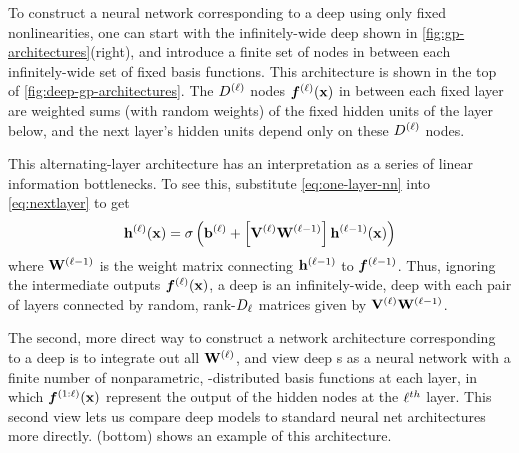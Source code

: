 To construct a neural network corresponding to a deep \gp{} using only fixed nonlinearities, 
one can start with the infinitely-wide deep \gp{} shown in \cref{fig:gp-architectures}(right), and introduce a finite set of nodes in between each infinitely-wide set of fixed basis functions.
This architecture is shown in the top of \cref{fig:deep-gp-architectures}.
The $D^{(\ell)}$ nodes $\boldsymbol{f}^{(\ell)}({\bf{x}})$ in between each fixed layer are weighted sums (with random weights) of the fixed hidden units of the layer below, and the next layer's hidden units depend only on these $D^{(\ell)}$ nodes.

This alternating-layer architecture has an interpretation as a series of linear information bottlenecks.
To see this, substitute \cref{eq:one-layer-nn} into \cref{eq:nextlayer} to get
%
\begin{align}
{\bf{h}}^{(\ell)}({\bf{x}}) = \sigma \left( {\bf{b}}^{(\ell)} + \left[ \mathbf{V}^{(\ell)} \mathbf{W}^{(\ell-1)} \right] {\bf{h}}^{(\ell-1)}({\bf{x}}) \right)
\end{align}
%
where $\mathbf{W}^{(\ell-1)}$ is the weight matrix connecting ${\bf{h}}^{(\ell-1)}$ to $\boldsymbol{f}^{(\ell - 1)}$.
Thus, ignoring the intermediate outputs $\boldsymbol{f}^{(\ell)}({\bf{x}})$, a deep \gp{} is an infinitely-wide, deep \MLP{} with each pair of layers connected by random, rank-$D_\ell$ matrices given by $\mathbf{V}^{(\ell)} \mathbf{W}^{(\ell-1)}$.

The second, more direct way to construct a network architecture corresponding to a deep \gp{} is to integrate out all $\mathbf{W}^{(\ell)}$, and view deep \gp{}s as a neural network with a finite number of nonparametric, \gp{}-distributed basis functions at each layer, in which $\boldsymbol{f}^{(1:\ell)}({\bf{x}})$ represent the output of the hidden nodes at the $\ell^{th}$ layer.
This second view lets us compare deep \gp{} models to standard neural net architectures more directly.
(bottom) shows an example of this architecture.





